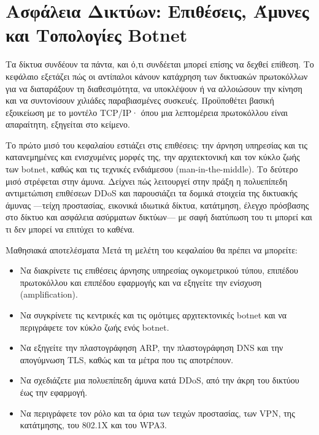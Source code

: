 \chapter{Ασφάλεια Δικτύων: Επιθέσεις, Άμυνες και Τοπολογίες Botnet}\label{ch:6}

Τα δίκτυα συνδέουν τα πάντα, και ό,τι συνδέεται μπορεί επίσης να δεχθεί επίθεση. Το κεφάλαιο εξετάζει πώς οι αντίπαλοι κάνουν κατάχρηση των δικτυακών πρωτοκόλλων για να διαταράξουν τη διαθεσιμότητα, να υποκλέψουν ή να αλλοιώσουν την κίνηση και να συντονίσουν χιλιάδες παραβιασμένες συσκευές. Προϋποθέτει βασική εξοικείωση με το μοντέλο TCP/IP· όπου μια λεπτομέρεια πρωτοκόλλου είναι απαραίτητη, εξηγείται στο κείμενο.

Το πρώτο μισό του κεφαλαίου εστιάζει στις επιθέσεις: την άρνηση υπηρεσίας και τις κατανεμημένες και ενισχυμένες μορφές της, την αρχιτεκτονική και τον κύκλο ζωής των botnet, καθώς και τις τεχνικές ενδιάμεσου (man-in-the-middle). Το δεύτερο μισό στρέφεται στην άμυνα. Δείχνει πώς λειτουργεί στην πράξη η πολυεπίπεδη αντιμετώπιση επιθέσεων DDoS και παρουσιάζει τα δομικά στοιχεία της δικτυακής άμυνας —τείχη προστασίας, εικονικά ιδιωτικά δίκτυα, κατάτμηση, έλεγχο πρόσβασης στο δίκτυο και ασφάλεια ασύρματων δικτύων— με σαφή διατύπωση του τι μπορεί και τι δεν μπορεί να επιτύχει το καθένα.

\begin{outcomesbox}{Μαθησιακά αποτελέσματα}
Μετά τη μελέτη του κεφαλαίου θα πρέπει να μπορείτε:
\begin{itemize}
  \item Να διακρίνετε τις επιθέσεις άρνησης υπηρεσίας ογκομετρικού τύπου, επιπέδου πρωτοκόλλου και επιπέδου εφαρμογής και να εξηγείτε την ενίσχυση (amplification).
  \item Να συγκρίνετε τις κεντρικές και τις ομότιμες αρχιτεκτονικές botnet και να περιγράφετε τον κύκλο ζωής ενός botnet.
  \item Να εξηγείτε την πλαστογράφηση ARP, την πλαστογράφηση DNS και την απογύμνωση TLS, καθώς και τα μέτρα που τις αποτρέπουν.
  \item Να σχεδιάζετε μια πολυεπίπεδη άμυνα κατά DDoS, από την άκρη του δικτύου έως την εφαρμογή.
  \item Να περιγράφετε τον ρόλο και τα όρια των τειχών προστασίας, των VPN, της κατάτμησης, του 802.1X και του WPA3.
\end{itemize}
\end{outcomesbox}

